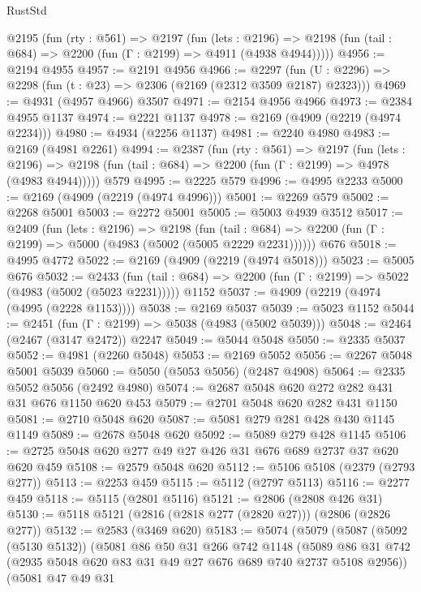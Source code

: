 \begin{lexlean}{RustStd}
\begin{coremodule}
  @2195
    (fun (rty : @561) =>
    @2197
      (fun (lets : @2196) =>
      @2198 (fun (tail : @684) => @2200 (fun (Γ : @2199) => @4911 (@4938 @4944)))))
@4956 := @2194 @4955
@4957 := @2191 @4956
@4966 := @2297 (fun (U : @2296) => @2298 (fun (t : @23) => @2306 (@2169 (@2312 @3509 @2187) @2323)))
@4969 := @4931 (@4957 @4966) @3507
@4971 := @2154 @4956 @4966
@4973 := @2384 @4955 @1137
@4974 := @2221 @1137
@4978 := @2169 (@4909 (@2219 (@4974 @2234)))
@4980 := @4934 (@2256 @1137)
@4981 := @2240 @4980
@4983 := @2169 (@4981 @2261)
@4994 := @2387
    (fun (rty : @561) =>
    @2197
      (fun (lets : @2196) =>
      @2198 (fun (tail : @684) => @2200 (fun (Γ : @2199) => @4978 (@4983 @4944)))))
    @579
@4995 := @2225 @579
@4996 := @4995 @2233
@5000 := @2169 (@4909 (@2219 (@4974 @4996)))
@5001 := @2269 @579
@5002 := @2268 @5001
@5003 := @2272 @5001
@5005 := @5003 @4939 @3512
@5017 := @2409
    (fun (lets : @2196) =>
    @2198
      (fun (tail : @684) => @2200 (fun (Γ : @2199) => @5000 (@4983 (@5002 (@5005 @2229 @2231))))))
    @676
@5018 := @4995 @4772
@5022 := @2169 (@4909 (@2219 (@4974 @5018)))
@5023 := @5005 @676
@5032 := @2433
    (fun (tail : @684) => @2200 (fun (Γ : @2199) => @5022 (@4983 (@5002 (@5023 @2231)))))
    @1152
@5037 := @4909 (@2219 (@4974 (@4995 (@2228 @1153))))
@5038 := @2169 @5037
@5039 := @5023 @1152
@5044 := @2451 (fun (Γ : @2199) => @5038 (@4983 (@5002 @5039)))
@5048 := @2464 (@2467 (@3147 @2472)) @2247
@5049 := @5044 @5048
@5050 := @2335 @5037
@5052 := @4981 (@2260 @5048)
@5053 := @2169 @5052
@5056 := @2267 @5048 @5001 @5039
@5060 := @5050 (@5053 @5056) (@2487 @4908)
@5064 := @2335 @5052 @5056 (@2492 @4980)
@5074 := @2687 @5048 @620 @272 @282 @431 @31 @676 @1150 @620 @453
@5079 := @2701 @5048 @620 @282 @431 @1150
@5081 := @2710 @5048 @620
@5087 := @5081 @279 @281 @428 @430 @1145 @1149
@5089 := @2678 @5048 @620
@5092 := @5089 @279 @428 @1145
@5106 := @2725 @5048 @620 @277 @49 @27 @426 @31 @676 @689 @2737 @37 @620 @620 @459
@5108 := @2579 @5048 @620
@5112 := @5106 @5108 (@2379 (@2793 @277))
@5113 := @2253 @459
@5115 := @5112 (@2797 @5113)
@5116 := @2277 @459
@5118 := @5115 (@2801 @5116)
@5121 := @2806 (@2808 @426 @31)
@5130 := @5118 @5121 (@2816 (@2818 @277 (@2820 @27))) (@2806 (@2826 @277))
@5132 := @2583 (@3469 @620)
@5183 := @5074
    (@5079
      (@5087
        (@5092 (@5130 @5132))
        (@5081
          @86
          @50
          @31
          @266
          @742
          @1148
          (@5089 @86 @31 @742 (@2935 @5048 @620 @83 @31 @49 @27 @676 @689 @740 @2737 @5108 @2956))
          (@5081
            @47
            @49
            @31

\end{coremodule}
\end{lexlean}

